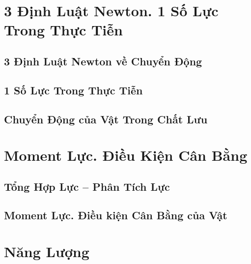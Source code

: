 \documentclass[oneside]{book}
\numberwithin{equation}{section}
\begin{document}

\chapter{3 Định Luật Newton. 1 Số Lực Trong Thực Tiễn}

\section{3 Định Luật Newton về Chuyển Động}


\section{1 Số Lực Trong Thực Tiễn}


\section{Chuyển Động của Vật Trong Chất Lưu}


\chapter{Moment Lực. Điều Kiện Cân Bằng}

\section{Tổng Hợp Lực -- Phân Tích Lực}


\section{Moment Lực. Điều kiện Cân Bằng của Vật}


\chapter{Năng Lượng}
\end{document}
